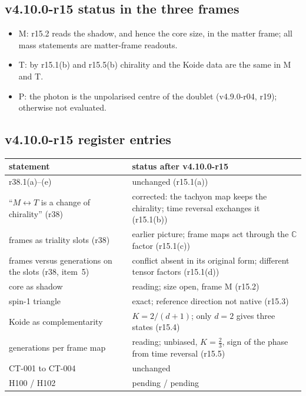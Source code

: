 \subsection*{v4.10.0-r15 status in the three frames}
\label{subsec:v4100-r15-frames}

\begin{itemize}[leftmargin=2em]
\item M: r15.2 reads the shadow, and hence the core size, in the matter frame; all mass statements are matter-frame readouts.
\item T: by r15.1(b) and r15.5(b) chirality and the Koide data are the same in M and T.
\item P: the photon is the unpolarised centre of the doublet (v4.9.0-r04, r19); otherwise not evaluated.
\end{itemize}

\subsection*{v4.10.0-r15 register entries}
\label{subsec:v4100-r15-register}

\begin{center}
\small
\begin{tabular}{@{}>{\raggedright\arraybackslash}p{}>{\raggedright\arraybackslash}p{}@{}}
\toprule
statement & status after v4.10.0-r15\\
\midrule
r38.1(a)--(e) & unchanged (r15.1(a))\\
``\(M\leftrightarrow T\) is a change of chirality'' (r38) & corrected: the tachyon map keeps the chirality; time reversal exchanges it (r15.1(b))\\
frames as triality slots (r38) & earlier picture; frame maps act through the \(\mathbb C\) factor (r15.1(c))\\
frames versus generations on the slots (r38, item~5) & conflict absent in its original form; different tensor factors (r15.1(d))\\
core as shadow & reading; size open, frame M (r15.2)\\
spin-1 triangle & exact; reference direction not native (r15.3)\\
Koide as complementarity & \(K=2/(d+1)\); only \(d=2\) gives three states (r15.4)\\
generations per frame map & reading; unbiased, \(K=\tfrac23\), sign of the phase from time reversal (r15.5)\\
CT-001 to CT-004 & unchanged\\
H100 / H102 & pending / pending\\
\bottomrule
\end{tabular}
\end{center}

